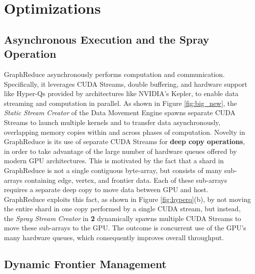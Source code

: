 \section{Optimizations}
\label{Optimization}




\subsection{Asynchronous Execution and the Spray Operation}
\label{opt1}


GraphReduce asynchronously performs computation and communication. Specifically, it leverages CUDA Streams, 
double buffering, and hardware support like Hyper-Qs provided by architectures like NVIDIA's Kepler, 
to enable data streaming and computation in parallel. As shown in Figure \ref{fig:big_new}, the \textit{Static Stream Creator} of the 
Data Movement Engine spawns separate CUDA Streams to launch multiple kernels and to transfer data asynchronously, 
overlapping memory copies within and across phases of computation. Novelty in GraphReduce is its use of separate 
CUDA Streams for {\bf deep copy operations}, in order to take advantage of the large number of hardware queues offered 
by modern GPU architectures. This is motivated by the fact that a shard in GraphReduce is not a single contiguous 
byte-array, but consists of many sub-arrays containing edge, vertex, and frontier data. Each of these sub-arrays 
requires a separate deep copy to move data between GPU and host. GraphReduce exploits this fact, as shown in 
Figure \ref{fig:hyperq}(b), by not moving the entire shard in one copy performed by a single CUDA stream, 
but instead, the \textit{Spray Stream Creator} in \textbf{2 }dynamically spawns multiple CUDA Streams 
to move these sub-arrays to the GPU. The outcome is concurrent use of the GPU's many hardware queues, which
consequently improves overall throughput.



\subsection{Dynamic Frontier Management}
\label{opt2}

